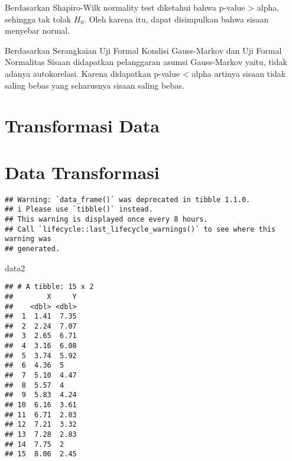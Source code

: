\documentclass[
]{article}
\newenvironment{Shaded}{\begin{snugshade}}{\end{snugshade}}
\newcommand{\FunctionTok}[1]{\textcolor[rgb]{0.13,0.29,0.53}{\textbf{#1}}}
\newcommand{\NormalTok}[1]{#1}
\newcommand{\OtherTok}[1]{\textcolor[rgb]{0.56,0.35,0.01}{#1}}
\newcommand{\SpecialCharTok}[1]{\textcolor[rgb]{0.81,0.36,0.00}{\textbf{#1}}}
\begin{document}
Berdasarkan Shapiro-Wilk normality test diketahui bahwa p-value
\textgreater{} alpha, sehingga tak tolak \(H_0\). Oleh karena itu, dapat
disimpulkan bahwa sisaan menyebar normal.

Berdasarkan Serangkaian Uji Formal Kondisi Gauss-Markov dan Uji Formal
Normalitas Sisaan didapatkan pelanggaran asumsi Gauss-Markov yaitu,
tidak adanya autokorelasi. Karena didapatkan p-value \textless{} alpha
artinya sisaan tidak saling bebas yang seharusnya sisaan saling bebas.

\hypertarget{transformasi-data}{%
\section{Transformasi Data}\label{transformasi-data}}

\hypertarget{data-transformasi}{%
\section{Data Transformasi}\label{data-transformasi}}

\begin{Shaded}
\end{Shaded}

\begin{verbatim}
## Warning: `data_frame()` was deprecated in tibble 1.1.0.
## i Please use `tibble()` instead.
## This warning is displayed once every 8 hours.
## Call `lifecycle::last_lifecycle_warnings()` to see where this warning was
## generated.
\end{verbatim}

\begin{Shaded}
\begin{Highlighting}[]
\NormalTok{data2}
\end{Highlighting}
\end{Shaded}

\begin{verbatim}
## # A tibble: 15 x 2
##        X     Y
##    <dbl> <dbl>
##  1  1.41  7.35
##  2  2.24  7.07
##  3  2.65  6.71
##  4  3.16  6.08
##  5  3.74  5.92
##  6  4.36  5   
##  7  5.10  4.47
##  8  5.57  4   
##  9  5.83  4.24
## 10  6.16  3.61
## 11  6.71  2.83
## 12  7.21  3.32
## 13  7.28  2.83
## 14  7.75  2   
## 15  8.06  2.45
\end{verbatim}
\end{document}
